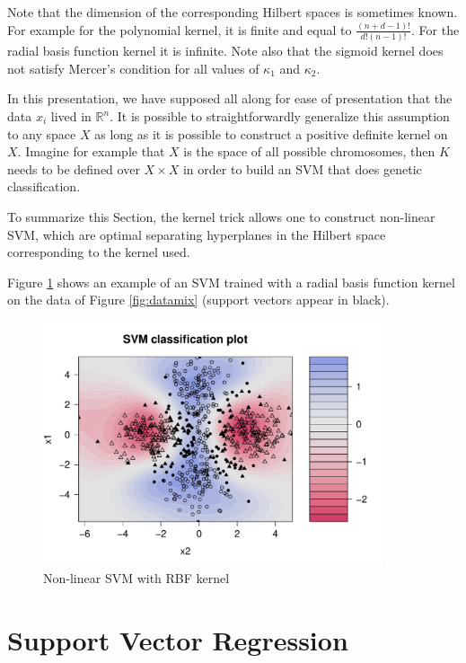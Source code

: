 \documentclass{article}
\begin{document}
Note that the dimension of the corresponding Hilbert spaces is sometimes known. For example for the polynomial kernel, it is finite and equal to $\frac{(n+d-1)!}{d!(n-1)!}$. For the radial basis function kernel it is infinite. Note also that the sigmoid kernel does not satisfy Mercer's condition for all values of $\kappa_1$ and $\kappa_2$.

In this presentation, we have supposed all along for ease of presentation that the data $x_i$ lived in $\mathbb{R}^n$. It is possible to straightforwardly generalize this assumption to any space $X$ as long as it is possible to construct a positive definite kernel on $X$. Imagine for example that $X$ is the space of all possible chromosomes, then $K$ needs to be defined over $X\times X$ in order to build an SVM that does genetic classification.

To summarize this Section, the kernel trick allows one to construct non-linear SVM, which are optimal separating hyperplanes in the Hilbert space corresponding to the kernel used.

Figure \ref{fig:datamix_svm} shows an example of an SVM trained with a radial basis function kernel on the data of Figure \ref{fig:datamix} (support vectors appear in black).

\begin{figure}
\begin{center}
\includegraphics[width=10cm]{../img/datamix_svm.pdf}
\end{center}
\caption{Non-linear SVM with RBF kernel}
\label{fig:datamix_svm}
\end{figure}

\section*{Support Vector Regression}
\end{document}
